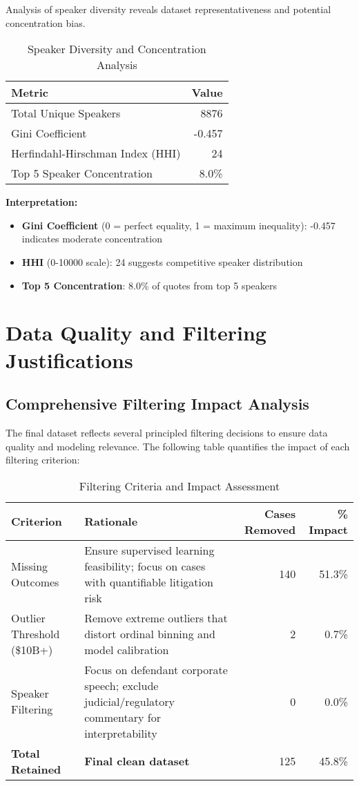 \documentclass[11pt]{article}
\begin{document}
Analysis of speaker diversity reveals dataset representativeness and potential concentration bias.

\begin{table}[H]
\centering
\caption{Speaker Diversity and Concentration Analysis}
\begin{tabular}{lr}
\toprule
\textbf{Metric} & \textbf{Value} \\
\midrule
Total Unique Speakers & 8876 \\
Gini Coefficient & -0.457 \\
Herfindahl-Hirschman Index (HHI) & 24 \\
Top 5 Speaker Concentration & 8.0\% \\
\bottomrule
\end{tabular}
\end{table}

\textbf{Interpretation:}
\begin{itemize}
\item \textbf{Gini Coefficient} (0 = perfect equality, 1 = maximum inequality): -0.457 indicates moderate concentration
\item \textbf{HHI} (0-10000 scale): 24 suggests competitive speaker distribution
\item \textbf{Top 5 Concentration}: 8.0\% of quotes from top 5 speakers
\end{itemize}

\section{Data Quality and Filtering Justifications}

\subsection{Comprehensive Filtering Impact Analysis}

The final dataset reflects several principled filtering decisions to ensure data quality and modeling relevance. The following table quantifies the impact of each filtering criterion:

\begin{table}[H]
\centering
\caption{Filtering Criteria and Impact Assessment}
\begin{tabular}{p{3cm}p{6cm}rr}
\toprule
\textbf{Criterion} & \textbf{Rationale} & \textbf{Cases Removed} & \textbf{\% Impact} \\
\midrule
Missing Outcomes & Ensure supervised learning feasibility; focus on cases with quantifiable litigation risk & 140 & 51.3\% \\
Outlier Threshold (\$10B+) & Remove extreme outliers that distort ordinal binning and model calibration & 2 & 0.7\% \\
Speaker Filtering & Focus on defendant corporate speech; exclude judicial/regulatory commentary for interpretability & 0 & 0.0\% \\
\midrule
\textbf{Total Retained} & \textbf{Final clean dataset} & 125 & 45.8\% \\
\bottomrule
\end{tabular}
\end{table}
\end{document}
